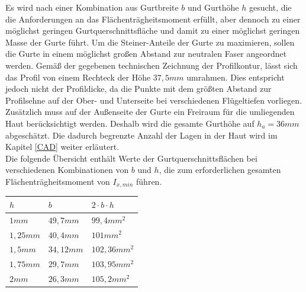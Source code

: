 \noindent Es wird nach einer Kombination aus Gurtbreite $ b $ und Gurthöhe $ h $ gesucht, die die Anforderungen an das Flächenträgheitsmoment erfüllt, aber dennoch zu einer möglichst geringen Gurtquerschnittsfläche und damit zu einer möglichst geringen Masse der Gurte führt. Um die Steiner-Anteile der Gurte zu maximieren, sollen die Gurte in einem möglichst großen Abstand zur neutralen Faser angeordnet werden. Gemäß der gegebenen technischen Zeichnung der Profilkontur, lässt sich das Profil von einem Rechteck der Höhe $ 37,5mm $ umrahmen. Dies entspricht jedoch nicht der Profildicke, da die Punkte mit dem größten Abstand zur Profilsehne auf der Ober- und Unterseite bei verschiedenen Flügeltiefen vorliegen. Zusätzlich muss auf der Außenseite der Gurte ein Freiraum für die umliegenden Haut berücksichtigt werden. Deshalb wird die gesamte Gurthöhe auf $ h_{a}=36mm $ abgeschätzt. Die dadurch begrenzte Anzahl der Lagen in der Haut wird im Kapitel \ref{CAD} weiter erläutert.\\ 

\noindent Die folgende Übersicht enthält Werte der Gurtquerschnittsflächen bei verschiedenen Kombinationen von $ b $ und $ h $, die zum erforderlichen gesamten Flächenträgheitsmoment von $ I_{x,min} $ führen.\\

		\begin{tabular}{l|l|l}
			$h$&$b$&$2\cdot b\cdot h$\\
			\hline
			$1mm$&$49,7mm$&$99,4mm^{2}$\\
			$1,25mm$&$40,4mm$&$101mm^{2}$\\
			$1,5mm$&$34,12mm$&$102,36mm^{2}$\\
			$ 1,75mm $&$ 29,7mm $&$ 103,95mm^{2} $\\
			$2mm$&$26,3mm$&$105,2mm^{2}$\\
		\end{tabular}\\

